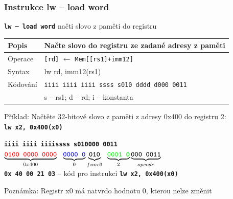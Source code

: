 \begin{frame}
\frametitle{Instrukce lw -- load word}

\textbf{\texttt{lw -- load word}} načti slovo z paměti do registru

\begin{tabular}{|l|l|}\hline
Popis & Načte slovo do registru ze zadané adresy z paměti \\ \hline
Operace & \texttt{[rd]} $\leftarrow$ \texttt{Mem[[rs1]+imm12]} \\ \hline
Syntax & lw rd, imm12(rs1) \\ \hline
Kódování & \texttt{iiii iiii iiii ssss s010 dddd d000 0011} \\ \hline
 & s -- rs1; d -- rd; i -- konstanta \\ \hline
\end{tabular}

\bigskip

Příklad: Načtěte 32-bitové slovo z paměti z adresy 0x400 do registru 2:\\
\textbf{\texttt{lw x2, 0x400(x0)}}

\textbf{\texttt{\color{red}iiii iiii iiii}}\phantom{xx}\textbf{\texttt{\color{blue}ssss s}}\hspace{0.1cm}\textbf{\texttt{010\hspace{0.05cm}000 0011}}\\
$\underbrace{\textbf{\texttt{\color{red}0100 0000 0000}}}_{0x400}\texttt{ }\underbrace{\textbf{\texttt{\color{blue}0000 0}}}_{0}\underbrace{\textbf{\texttt{010}}}_{func3}\phantom{i}\underbrace{\textbf{\texttt{\color{green}0001 0}}}_{2}\underbrace{\textbf{\texttt{000 0011}}}_{opcode}$\\

\textbf{\texttt{0x 40 00 21 03}} -- kód pro instrukci \textbf{\texttt{lw x2, 0x400(x0)}}

Poznámka: Registr x0 má natvrdo hodnotu 0, kterou nelze změnit

\end{frame}

